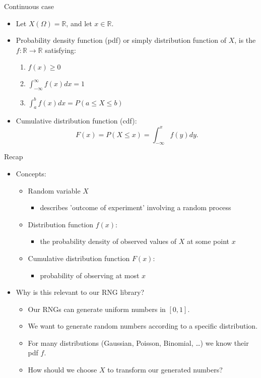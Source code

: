 \documentclass[10pt]{beamer}
\begin{document}
\begin{frame}[label={sec:org70bcd08}]{Continuous case}
\begin{itemize}
\item Let \(X(\Omega) = \mathbb{R}\), and let \(x \in \mathbb{R}\).
\item Probability density function (pdf) or simply \alert{distribution function of \(X\)},
is the \(f: \mathbb{R} \to \mathbb{R}\) satisfying:
\begin{enumerate}
\item \(f(x) \geq 0\)
\item \(\int_{-\infty}^{\infty} f(x) dx = 1\)
\item \(\int_a^b f(x) dx = P(a \leq X \leq b)\)
\end{enumerate}
\item \alert{Cumulative distribution function} (cdf):
$$F(x) = P(X \leq x) = \int_{-\infty}^x f(y) dy.$$
\end{itemize}
\end{frame}
\begin{frame}[label={sec:orgcf64d30}]{Recap}
\begin{itemize}
\item Concepts:
\begin{itemize}
\item \alert{Random variable} \(X\)
\begin{itemize}
\item describes 'outcome of experiment' involving a random process
\end{itemize}
\item \alert{Distribution function} \(f(x)\):
\begin{itemize}
\item the probability density of observed values of \(X\) at some point \(x\)
\end{itemize}
\item \alert{Cumulative distribution function} \(F(x)\):
\begin{itemize}
\item probability of observing at most \(x\)
\end{itemize}
\end{itemize}
\item Why is this relevant to our \alert{RNG library}?
\begin{itemize}
\item Our RNGs can generate uniform numbers in \([0, 1]\).
\item We want to generate random numbers according to a \alert{specific distribution}.
\item For many distributions (Gaussian, Poisson, Binomial, \ldots{}) we know their pdf
\(f\).
\item \alert{How should we choose \(X\)} to transform our generated numbers?
\end{itemize}
\end{itemize}
\end{frame}
\end{document}
